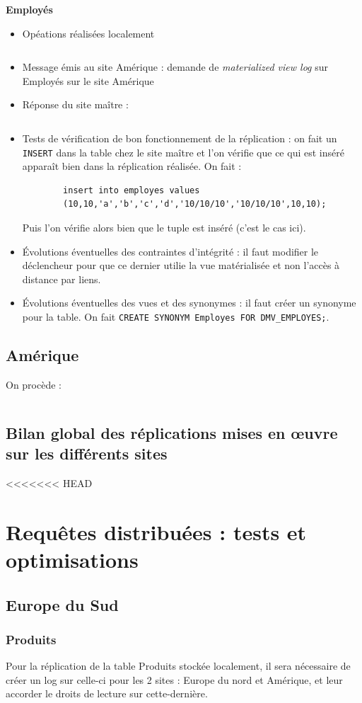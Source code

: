 \documentclass[10pt,a4paper]{article}
\theoremstyle{plain}
\begin{document}
\textbf{Employés}
\begin{itemize}
    \item Opéations réalisées localement
    \inputminted{sql}{EUS_V-A-5-b1.sql}
    \item Message émis au site Amérique : demande de \emph{materialized view log} sur Employés sur le site Amérique
    \item Réponse du site maître : \inputminted{sql}{EUS_V-A-5-b3.sql}
    \item Tests de vérification de bon fonctionnement de la réplication : on fait un \verb|INSERT| dans la table chez le site maître et l'on vérifie que ce qui est inséré apparaît bien dans la réplication réalisée.
    On fait :
    \begin{verbatim}
    	insert into employes values
    	(10,10,'a','b','c','d','10/10/10','10/10/10',10,10);
    \end{verbatim}
    Puis l'on vérifie alors bien que le tuple est inséré (c'est le cas ici).
    \item Évolutions éventuelles des contraintes d'intégrité : il faut modifier le déclencheur pour que ce dernier utilie la vue matérialisée et non l'accès à distance par liens.
    \item Évolutions éventuelles des vues et des synonymes : il faut créer un synonyme pour la table. On fait \verb|CREATE SYNONYM Employes FOR DMV_EMPLOYES;|.
\end{itemize}
\newpage 

\subsection{Amérique}
On procède :
\inputminted{sql}{AM_Replica.sql}

\subsection{Bilan global des réplications mises en \oe uvre sur les différents sites}
<<<<<<< HEAD
\newpage 

\section{Requêtes distribuées : tests et optimisations}
\subsection{Europe du Sud}
\subsubsection{Produits}
Pour la réplication de la table Produits stockée localement, il sera nécessaire de créer un log sur celle-ci pour les 2 sites : Europe du nord et Amérique, et leur accorder le droits de lecture sur cette-dernière.
\end{document}
